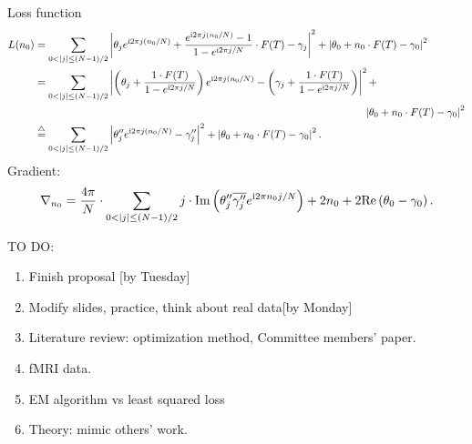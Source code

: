 \noindent
Loss function
\begin{equation*}
		\begin{aligned}\label{eq:aligned distance}
		L(n_0)&=
		\sum_{0<|j|\leq (N-1)/2}
		\left| \theta_{j}e^{\complexunit 2\pi j (n_0/N)}+
		\frac{e^{\complexunit{}2\pi j (n_0/N)}-1}{1-e^{\complexunit{}2\pi j /N}}
		\cdot F(T)
		-\gamma_{j} \right|^2
		+ \left| \theta_0+n_0\cdot F(T)-\gamma_0 \right|^2
		\\
		&=
		\sum_{0<|j|\leq (N-1)/2}
		\left| \left( \theta_{j}+ \frac{1\cdot F(T)}{1-e^{\complexunit{}2\pi j /N}} \right) e^{\complexunit{}2\pi j (n_0/N)} 
		- \left( \gamma_{j}+\frac{1\cdot F(T)}{1-e^{\complexunit{}2\pi j /N}} \right)  \right|^2 
		+\\
		&\hspace{11cm} \left| \theta_0+n_0\cdot F(T)-\gamma_0 \right|^2
		\\
		&\overset{\triangle}{=}
		\sum_{0<|j|\leq (N-1)/2}\left| \theta_{j}'' e^{\complexunit{}2\pi j (n_0/N)} - {\gamma_{j}''}  \right|^2
		+ \left| \theta_0+n_0\cdot F(T)-\gamma_0 \right|^2
		.
\end{aligned}
\end{equation*}
\noindent
Gradient:
	\begin{equation}
		\begin{split}
		\nabla_{n_0} = \frac{4\pi}{N}\cdot 
		\sum_{0<|j|\leq (N-1)/2} j\cdot 
		\text{Im} \left( {\theta_j''}\overline{{\gamma_j''}}e^{\complexunit2\pi n_0 j/N} \right) 
		+ 2n_0+2 \text{Re}\left( \theta_0-\gamma_0 \right) .
		\end{split}
		\end{equation}





TO DO:
\begin{enumerate}
	\item Finish proposal [by Tuesday]
	\item Modify slides, practice, think about real data[by Monday]
	\item Literature review: optimization method, Committee members' paper.
	\item fMRI data.
	\item EM algorithm vs least squared loss
	\item Theory: mimic others' work. 
	
\end{enumerate}




